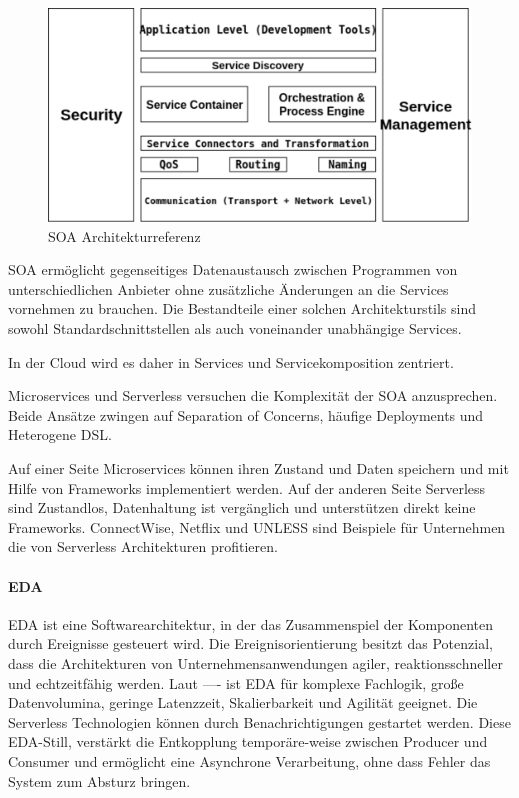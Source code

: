 \documentclass[
12pt,
english,
ngerman,
headsepline,
twoside,
openright,
numbers=noenddot,version=first
]{scrreprt}
\begin{document}
\begin{figure}
	\includegraphics[scale=0.60]{./pics/arch-soa.eps}
	\caption{SOA Architekturreferenz\cite{archSoa}}
	\label{pic:arch-soa}
\end{figure}

SOA ermöglicht gegenseitiges Datenaustausch zwischen Programmen von unterschiedlichen Anbieter ohne zusätzliche Änderungen an die Services vornehmen zu brauchen. Die Bestandteile einer solchen Architekturstils sind sowohl Standardschnittstellen als auch voneinander unabhängige Services\cite{archSoa}. 

In der Cloud wird es daher in Services und Servicekomposition zentriert\cite{cloudEssentials}.

Microservices und Serverless versuchen die Komplexität der SOA anzusprechen. Beide Ansätze zwingen auf Separation of Concerns, häufige Deployments und Heterogene \acrfull{DSL}.

Auf einer Seite Microservices können ihren Zustand und Daten speichern und mit Hilfe von Frameworks implementiert werden. Auf der anderen Seite Serverless sind Zustandlos, Datenhaltung ist vergänglich und unterstützen direkt keine Frameworks.
ConnectWise\cite{ConnectWise}, Netflix\cite{Netflix} und UNLESS\cite{UNLESS} sind Beispiele für Unternehmen die von Serverless Architekturen profitieren.

\paragraph{EDA}
\acrfull{EDA} ist eine Softwarearchitektur, in der das Zusammenspiel der Komponenten durch Ereignisse gesteuert wird. Die Ereignisorientierung besitzt das Potenzial, dass die Architekturen von Unternehmensanwendungen agiler, reaktionsschneller und
echtzeitfähig werden. Laut ---- ist \acrshort{EDA} für komplexe Fachlogik, große Datenvolumina, geringe Latenzzeit, Skalierbarkeit und Agilität geeignet.\cite{archEDA}
Die Serverless Technologien können durch Benachrichtigungen gestartet werden. Diese \acrshort{EDA}-Still, verstärkt die Entkopplung temporäre-weise zwischen Producer und Consumer und ermöglicht eine Asynchrone Verarbeitung, ohne dass Fehler das System zum Absturz bringen.\cite{patternIntegrationEnterprise}
\end{document}
